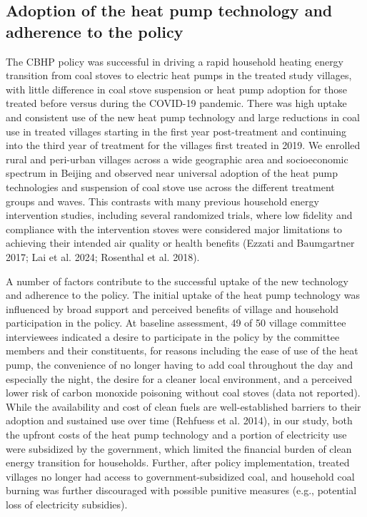 \documentclass[
  letterpaper,
  DIV=11,
  numbers=noendperiod]{scrartcl}
\begin{document}
\hypertarget{adoption-of-the-heat-pump-technology-and-adherence-to-the-policy}{%
\subsection{Adoption of the heat pump technology and adherence to the
policy}\label{adoption-of-the-heat-pump-technology-and-adherence-to-the-policy}}

The CBHP policy was successful in driving a rapid household heating
energy transition from coal stoves to electric heat pumps in the treated
study villages, with little difference in coal stove suspension or heat
pump adoption for those treated before versus during the COVID-19
pandemic. There was high uptake and consistent use of the new heat pump
technology and large reductions in coal use in treated villages starting
in the first year post-treatment and continuing into the third year of
treatment for the villages first treated in 2019. We enrolled rural and
peri-urban villages across a wide geographic area and socioeconomic
spectrum in Beijing and observed near universal adoption of the heat
pump technologies and suspension of coal stove use across the different
treatment groups and waves. This contrasts with many previous household
energy intervention studies, including several randomized trials, where
low fidelity and compliance with the intervention stoves were considered
major limitations to achieving their intended air quality or health
benefits (Ezzati and Baumgartner 2017; Lai et al. 2024; Rosenthal et al.
2018).

A number of factors contribute to the successful uptake of the new
technology and adherence to the policy. The initial uptake of the heat
pump technology was influenced by broad support and perceived benefits
of village and household participation in the policy. At baseline
assessment, 49 of 50 village committee interviewees indicated a desire
to participate in the policy by the committee members and their
constituents, for reasons including the ease of use of the heat pump,
the convenience of no longer having to add coal throughout the day and
especially the night, the desire for a cleaner local environment, and a
perceived lower risk of carbon monoxide poisoning without coal stoves
(data not reported). While the availability and cost of clean fuels are
well-established barriers to their adoption and sustained use over time
(Rehfuess et al. 2014), in our study, both the upfront costs of the heat
pump technology and a portion of electricity use were subsidized by the
government, which limited the financial burden of clean energy
transition for households. Further, after policy implementation, treated
villages no longer had access to government-subsidized coal, and
household coal burning was further discouraged with possible punitive
measures (e.g., potential loss of electricity subsidies).
\end{document}
